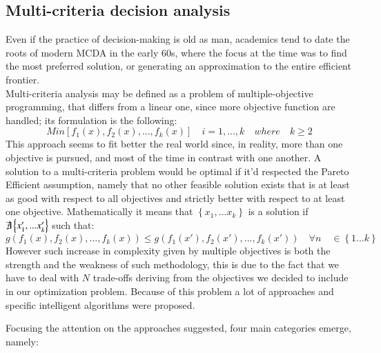 \begin{doublespace}
\section{Multi-criteria decision analysis}
Even if the practice of decision-making is old as man, academics tend to date the roots of modern MCDA in the early 60s, where the focus at the time was to find the most preferred solution, or generating an approximation to the entire efficient frontier\cite{Greco2016}.
\\
Multi-criteria analysis may be defined as a problem of multiple-objective programming, that differs from a linear one,
since more objective function are handled; its formulation is the following:
	$$
	Min[f_1(x),f_2(x),...,f_k(x)] \quad i=1,...,k \quad where \quad k\geq2
	$$
This approach seems to fit better the real world since, in reality, more than one objective is pursued, and most of the time in contrast with one another.
A solution to a multi-criteria problem would be optimal if it'd respected the Pareto Efficient assumption, namely that no other feasible solution exists that is at least as good with respect to all objectives and strictly better with respect to at least one objective. Mathematically it means that $\left\{x_1,...x_k\right\}$ is a solution if $\not\exists \left\{x'_1,...x'_k\right\}$
such that:
	\[
	g(f_1(x),f_2(x),...,f_k(x)) \leq g(f_1(x'),f_2(x'),...,f_k(x')) \quad \forall n \quad \in  \left\{1...k\right\}
	\]
However such increase in complexity given by multiple objectives is both the strength and the weakness of such methodology, this is due to the fact that we have to deal with $N$ trade-offs deriving from the objectives we decided to include in our optimization problem. Because of this problem a lot of approaches and specific intelligent algorithms were proposed\cite{Cui2017}.

Focusing the attention on the approaches suggested, four main categories emerge, namely:


\end{doublespace}
